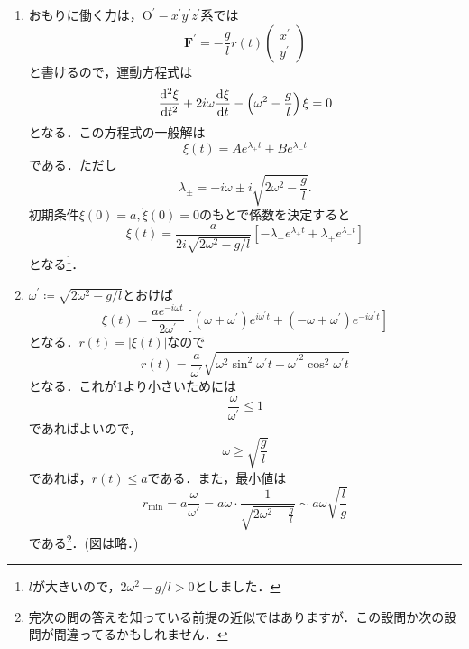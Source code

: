 \documentclass[a4paper,pdflatex,ja=standard]{bxjsarticle}
\begin{document}
\begin{enumerate}
  \item 
  おもりに働く力は，$\text{O}^{\prime}-x^{\prime}y^{\prime}z^{\prime}$系では
  \begin{equation}
    \bm{F}^{\prime}
    =
    -\frac{g}{l}r(t)
    \begin{pmatrix}
      x^{\prime} \\
      y^{\prime}
    \end{pmatrix}
  \end{equation}
  と書けるので，運動方程式は
  \begin{equation}
    \dv[2]{\xi}{t}
    +
    2i\omega\dv{\xi}{t}
    -
    \left( \omega^2-\frac{g}{l} \right)
    \xi
    =
    0
  \end{equation}
  となる．この方程式の一般解は
  \begin{equation}
    \xi(t)
    =
    Ae^{\lambda_{+}t}
    +
    Be^{\lambda_{-}t}
  \end{equation}
  である．ただし
  \begin{equation}
    \lambda_{\pm}
    =
    -i\omega
    \pm
    i\sqrt{2\omega^2-\frac{g}{l}}
    .
  \end{equation}
  初期条件$\xi(0)=a, \dot{\xi}(0)=0$のもとで係数を決定すると
  \begin{equation}
    \xi(t)
    =
    \frac{a}{2i\sqrt{2\omega^2-g/l}}
    \left[  
      -
      \lambda_{-}e^{\lambda_{+}t}
      +
      \lambda_{+}e^{\lambda_{-}t}
    \right]
  \end{equation}
  となる\footnote{
    $l$が大きいので，$2\omega^2-g/l>0$としました．
  }．

  \item 
  $\omega^{\prime}\coloneqq\sqrt{2\omega^2-g/l}$とおけば
  \begin{equation}
    \xi(t)
    =
    \frac{ae^{-i\omega t}}{2\omega^{\prime}}
    \left[  
      (\omega+\omega^{\prime})e^{i\omega^{\prime}t}
      +
      (-\omega+\omega^{\prime})e^{-i\omega^{\prime}t}
    \right]
  \end{equation}
  となる．$r(t)=|\xi(t)|$なので
  \begin{equation}
    r(t)
    =
    \frac{a}{\omega^{\prime}}
    \sqrt{\omega^2\sin^2\omega^{\prime}t+{\omega^{\prime}}^2\cos^2\omega^{\prime}t}
  \end{equation}
  となる．これが1より小さいためには
  \begin{equation}
    \frac{\omega}{\omega^{\prime}}
    \leq
    1
  \end{equation}
  であればよいので，
  \begin{equation}
    \omega\geq\sqrt{\frac{g}{l}}
  \end{equation}
  であれば，$r(t)\leq a$である．また，最小値は
  \begin{equation}
    r_{\min}
    =
    a
    \frac{\omega}{\omega'}
    =
    a\omega
    \cdot
    \frac{1}{\sqrt{2\omega^2-\frac{g}{l}}}
    \sim
    a\omega \sqrt{\frac{l}{g}}
  \end{equation}
  である\footnote{
    完次の問の答えを知っている前提の近似ではありますが．この設問か次の設問が間違ってるかもしれません．
  }．(図は略．)


\end{enumerate}
\end{document}
